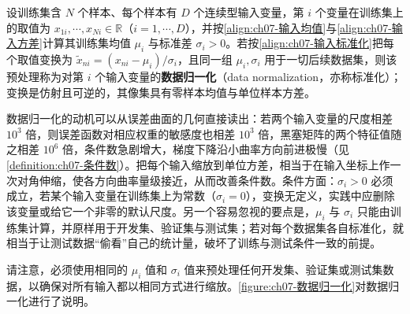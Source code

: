 \documentclass[../../main.tex]{subfiles}
\begin{document}
\begin{definition}[数据归一化]\label{definition:ch07-数据归一化}
设训练集含 $N$ 个样本、每个样本有 $D$ 个连续型输入变量，第 $i$ 个变量在训练集上的取值为 $x_{1i},\cdots,x_{Ni}\in\mathbb{R}$（$i=1,\cdots,D$），并按\eqref{align:ch07-输入均值}与\eqref{align:ch07-输入方差}计算其训练集均值 $\mu_{i}$ 与标准差 $\sigma_{i}>0$。若按\eqref{align:ch07-输入标准化}把每个取值变换为 $\tilde{x}_{ni}=(x_{ni}-\mu_{i})/\sigma_{i}$，且同一组 $\mu_{i},\sigma_{i}$ 用于一切后续数据集，则该预处理称为对第 $i$ 个输入变量的\textbf{数据归一化}（data normalization，亦称标准化）；变换是仿射且可逆的，其像集具有零样本均值与单位样本方差。
\end{definition}

\begin{remark}
数据归一化的动机可以从误差曲面的几何直接读出：若两个输入变量的尺度相差 $10^{3}$ 倍，则误差函数对相应权重的敏感度也相差 $10^{3}$ 倍，黑塞矩阵的两个特征值随之相差 $10^{6}$ 倍，条件数急剧增大，梯度下降沿小曲率方向前进极慢（见\cref{definition:ch07-条件数}）。把每个输入缩放到单位方差，相当于在输入坐标上作一次对角伸缩，使各方向曲率量级接近，从而改善条件数。条件方面：$\sigma_i>0$ 必须成立，若某个输入变量在训练集上为常数（$\sigma_i=0$），变换无定义，实践中应删除该变量或给它一个非零的默认尺度。另一个容易忽视的要点是，$\mu_i$ 与 $\sigma_i$ 只能由训练集计算，并原样用于开发集、验证集与测试集；若对每个数据集各自标准化，就相当于让测试数据“偷看”自己的统计量，破坏了训练与测试条件一致的前提。
\end{remark}

请注意，必须使用相同的 $\mu_i$ 值和 $\sigma_i$ 值来预处理任何开发集、验证集或测试集数据，以确保对所有输入都以相同方式进行缩放。\cref{figure:ch07-数据归一化}对数据归一化进行了说明。
\end{document}
